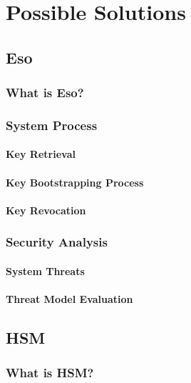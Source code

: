 \chapter{Possible Solutions}\label{C:solutionanalysis}
	
	\section{Eso}
		\subsection{What is Eso?}

		\subsection{System Process}

			\subsubsection{Key Retrieval}

			\subsubsection{Key Bootstrapping Process}

			\subsubsection{Key Revocation}

		\subsection{Security Analysis}

			\subsubsection{System Threats}

			\subsubsection{Threat Model Evaluation}

	\section{HSM}
		\subsection{What is HSM?}

